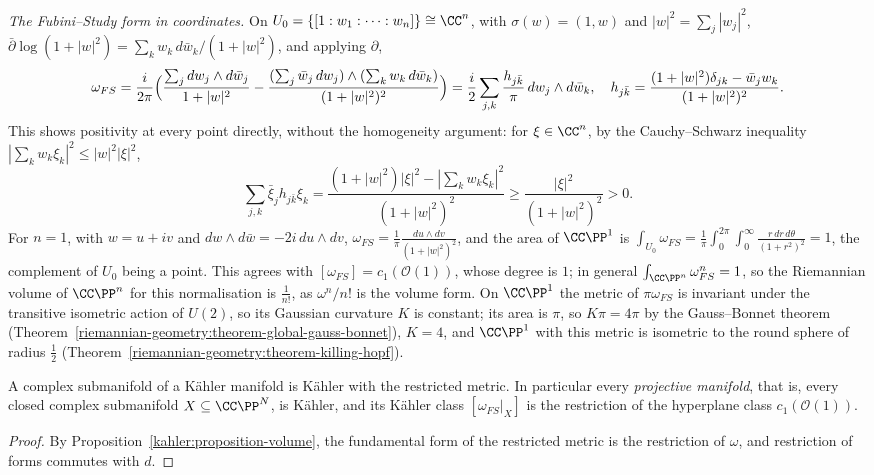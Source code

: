 \begin{example}\label{kahler:example-fubini-study-explicit}
\emph{The Fubini--Study form in coordinates.} On $U_0 = \{[1 : w_1 : \cdots : w_n]\} \cong \CC^n$, with $\sigma(w) = (1, w)$ and $|w|^2 = \sum_j|w_j|^2$,
$\bar\partial\log(1 + |w|^2) = \sum_kw_k\,d\bar w_k/(1 + |w|^2)$, and applying $\partial$,
\[
\omega_{FS} = \frac{i}{2\pi}\Bigl(\frac{\sum_jdw_j \wedge d\bar w_j}{1 + |w|^2} - \frac{(\sum_j\bar w_j\,dw_j) \wedge (\sum_kw_k\,d\bar w_k)}{(1 + |w|^2)^2}\Bigr)
= \frac{i}{2}\sum_{j,k}\frac{h_{j\bar k}}{\pi}\,dw_j \wedge d\bar w_k, \quad h_{j\bar k} = \frac{(1 + |w|^2)\delta_{jk} - \bar w_jw_k}{(1 + |w|^2)^2}.
\]
This shows positivity at every point directly, without the homogeneity argument: for $\xi \in \CC^n$, by the Cauchy--Schwarz inequality $|\sum_kw_k\xi_k|^2 \leq |w|^2|\xi|^2$,
\[
\sum_{j,k}\bar\xi_jh_{j\bar k}\xi_k = \frac{(1 + |w|^2)|\xi|^2 - |\sum_kw_k\xi_k|^2}{(1 + |w|^2)^2} \geq \frac{|\xi|^2}{(1 + |w|^2)^2} > 0 .
\]
For $n = 1$, with $w = u + iv$ and $dw \wedge d\bar w = -2i\,du \wedge dv$, $\omega_{FS} = \frac1\pi\frac{du \wedge dv}{(1 + |w|^2)^2}$, and the area of $\CC\PP^1$ is
$\int_{U_0}\omega_{FS} = \frac1\pi\int_0^{2\pi}\int_0^\infty\frac{r\,dr\,d\theta}{(1 + r^2)^2} = 1$, the complement of $U_0$ being a point. This agrees with $[\omega_{FS}] = c_1(\mathcal{O}(1))$, whose degree is
$1$; in general $\int_{\CC\PP^n}\omega_{FS}^n = 1$, so the Riemannian volume of $\CC\PP^n$ for this normalisation is $\frac1{n!}$, as $\omega^n/n!$ is the volume form. On $\CC\PP^1$ the metric of
$\pi\omega_{FS}$ is invariant under the transitive isometric action of $U(2)$, so its Gaussian curvature $K$ is constant; its area is $\pi$, so $K\pi = 4\pi$ by the Gauss--Bonnet theorem
(Theorem~\ref{riemannian-geometry:theorem-global-gauss-bonnet}), $K = 4$, and $\CC\PP^1$ with this metric is isometric to the round sphere of radius $\frac12$
(Theorem~\ref{riemannian-geometry:theorem-killing-hopf}).
\end{example}

\begin{corollary}\label{kahler:corollary-projective-kahler}
A complex submanifold of a K\"ahler manifold is K\"ahler with the restricted metric. In particular every \emph{projective manifold}, that is,
every closed complex submanifold $X \subseteq \CC\PP^N$, is K\"ahler, and its K\"ahler class $[\omega_{FS}|_X]$ is the restriction of the
hyperplane class $c_1(\mathcal{O}(1))$.
\end{corollary}

\begin{proof}
By Proposition~\ref{kahler:proposition-volume}, the fundamental form of the restricted metric is the restriction of $\omega$, and restriction
of forms commutes with $d$.
\end{proof}

